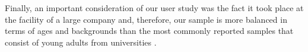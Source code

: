 Finally, an important consideration of our user study was the fact it took place at the facility of a large company and, therefore, our sample is more balanced in terms of ages and backgrounds than the most commonly reported  samples that consist of young adults from universities \cite{baxter2016characterising}. 



